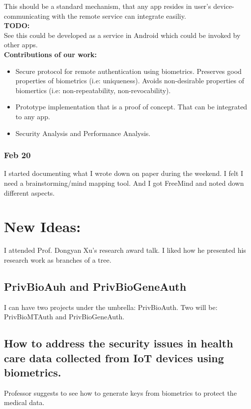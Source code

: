 \documentclass[11pt]{article}
\begin{document}
This should be a standard mechanism, that any app resides in user's device-communicating with the remote service can integrate easiliy.\\
\textbf{TODO:}\\
See this could be developed as a service in Android which could be invoked by other apps.\\

\textbf{Contributions of our work:}
\begin{itemize}
 \item Secure protocol for remote authentication using biometrics. Preserves good properties of biometrics (i.e: uniqueness). Avoids non-desirable 
properties of biomertics (i.e: non-repeatability, non-revocability).
 \item Prototype implementation that is a proof of concept. That can be integrated to any app.
 \item Security Analysis and Performance Analysis.
\end{itemize}

\subsubsection*{Feb 20}
I started documenting what I wrote down on paper during the weekend. I felt I need a brainstorming/mind mapping tool. And I got FreeMind and noted 
down different aspects.\\


\pagebreak
\section*{New Ideas:}

I attended Prof. Dongyan Xu's research award talk. I liked how he presented his research work as branches of a tree.

\subsection*{PrivBioAuh and PrivBioGeneAuth}
I can have two projects under the umbrella: PrivBioAuth. Two will be: PrivBioMTAuth and PrivBioGeneAuth.\\

\subsection*{How to address the security issues in health care data collected from IoT devices using biometrics.}
Professor suggests to see how to generate keys from biometrics to protect the medical data.
\end{document}
